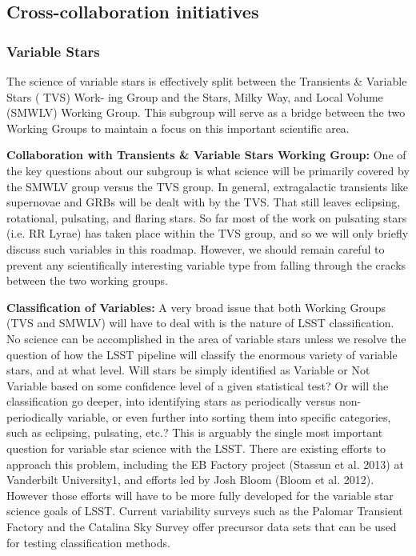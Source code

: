 \subsection{Cross-collaboration initiatives}

\subsubsection{Variable Stars}

The science of variable stars is effectively split between the Transients \& Variable Stars ( TVS) Work- ing Group and the Stars, Milky Way, and Local Volume (SMWLV) Working Group. This subgroup will serve as a bridge between the two Working Groups to maintain a focus on this important scientific area. 

{\bf Collaboration with Transients \& Variable Stars Working Group:}
One of the key questions about our subgroup is what science will be primarily covered by the SMWLV group versus the TVS group. In general, extragalactic transients like supernovae and GRBs will be dealt with by the TVS. That still leaves eclipsing, rotational, pulsating, and flaring stars. So far most of the work on pulsating stars (i.e. RR Lyrae) has taken place within the TVS group, and so we will only briefly discuss such variables in this roadmap. However, we should remain careful to prevent any scientifically interesting variable type from falling through the cracks between the two working groups. 

{\bf Classification of Variables:}
A very broad issue that both Working Groups (TVS and SMWLV) will have to deal with is the nature of LSST classification. No science can be accomplished in the area of variable stars unless we resolve the question of how the LSST pipeline will classify the enormous variety of variable stars, and at what level. 
Will stars be simply identified as Variable or Not Variable based on some confidence level of a given statistical test? Or will the classification go deeper, into identifying stars as periodically versus non- periodically variable, or even further into sorting them into specific categories, such as eclipsing, pulsating, etc.? This is arguably the single most important question for variable star science with the LSST. There are existing efforts to approach this problem, including the EB Factory project (Stassun et al. 2013) at Vanderbilt University1, and efforts led by Josh Bloom (Bloom et al. 2012). However those efforts will have to be more fully developed for the variable star science goals of LSST. Current variability surveys such as the Palomar Transient Factory and the Catalina Sky Survey offer precursor data sets that can be used for testing classification methods. 

